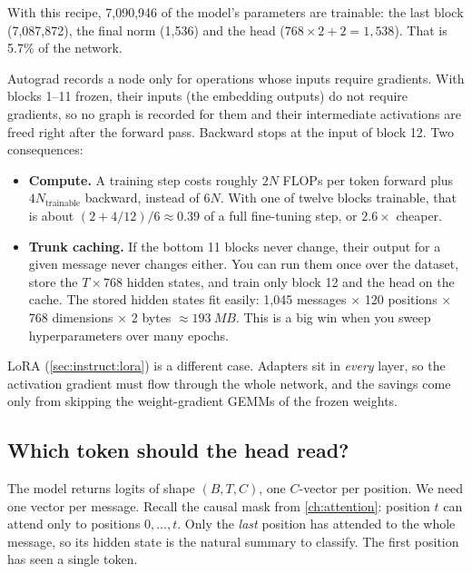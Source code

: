 With this recipe, 7{,}090{,}946 of the model's parameters are trainable: the last block
(7{,}087{,}872), the final norm (1{,}536) and the head ($768\times2+2 = 1{,}538$). That is
5.7\% of the network.

\begin{systemslens}
Autograd records a node only for operations whose inputs require gradients. With blocks
1--11 frozen, their inputs (the embedding outputs) do not require gradients, so no
graph is recorded for them and their intermediate activations are freed right after
the forward pass. Backward stops at the input of block 12. Two consequences:
\begin{itemize}
\item \textbf{Compute.} A training step costs roughly $2N$ FLOPs per token forward plus
$4N_{\text{trainable}}$ backward, instead of $6N$. With one of twelve blocks trainable,
that is about $(2 + 4/12)/6 \approx 0.39$ of a full fine-tuning step, or $2.6\times$
cheaper.
\item \textbf{Trunk caching.} If the bottom 11 blocks never change, their output for a
given message never changes either. You can run them once over the dataset, store the
$T\times 768$ hidden states, and train only block 12 and the head on the cache. The
stored hidden states fit easily: 1{,}045 messages $\times$ 120 positions
$\times$ 768 dimensions $\times$ 2 bytes $\approx \SI{193}{MB}$. This is a big win when
you sweep hyperparameters over many epochs.
\end{itemize}
LoRA (\cref{sec:instruct:lora}) is a different case. Adapters sit in \emph{every}
layer, so the activation gradient must flow through the whole network, and the savings
come only from skipping the weight-gradient GEMMs of the frozen weights.
\end{systemslens}

\subsection{Which token should the head read?}

The model returns logits of shape $(B, T, C)$, one $C$-vector per position. We need one
vector per message. Recall the causal mask from \cref{ch:attention}: position $t$ can
attend only to positions $0,\dots,t$. Only the \emph{last} position has attended to the
whole message, so its hidden state is the natural summary to classify. The first
position has seen a single token.

